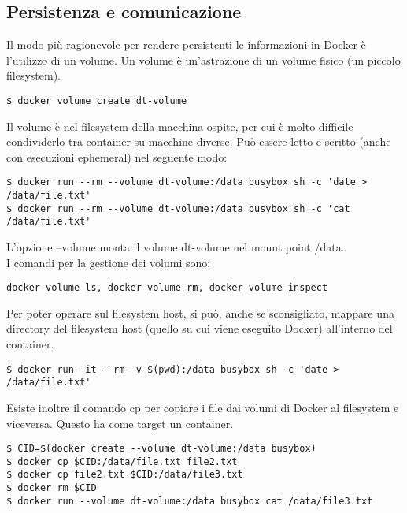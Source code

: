 \subsection{Persistenza e comunicazione}

Il modo più ragionevole per rendere persistenti le informazioni in Docker è l'utilizzo di un volume. 
Un volume è un'astrazione di un volume fisico (un piccolo filesystem). 

\begin{verbatim}
$ docker volume create dt-volume
\end{verbatim}

\noindent Il volume è nel filesystem della macchina ospite, per cui è molto difficile condividerlo tra container su macchine diverse. Può essere letto e scritto (anche con esecuzioni ephemeral) nel seguente modo:

\begin{verbatim}
$ docker run --rm --volume dt-volume:/data busybox sh -c 'date > /data/file.txt'
$ docker run --rm --volume dt-volume:/data busybox sh -c 'cat /data/file.txt'
\end{verbatim}

\noindent L'opzione --volume monta il volume dt-volume nel mount point /data.\\

\noindent I comandi per la gestione dei volumi sono:

\begin{verbatim}
docker volume ls, docker volume rm, docker volume inspect
\end{verbatim}

\noindent Per poter operare sul filesystem host, si può, anche se sconsigliato, mappare una directory del filesystem host (quello su cui viene eseguito Docker) all'interno del container.

\begin{verbatim}
$ docker run -it --rm -v $(pwd):/data busybox sh -c 'date > /data/file.txt'
\end{verbatim}

\noindent Esiste inoltre il comando cp per copiare i file dai volumi di Docker al filesystem e viceversa. Questo ha come target un container.

\begin{verbatim}
$ CID=$(docker create --volume dt-volume:/data busybox)
$ docker cp $CID:/data/file.txt file2.txt
$ docker cp file2.txt $CID:/data/file3.txt
$ docker rm $CID
$ docker run --volume dt-volume:/data busybox cat /data/file3.txt
\end{verbatim}

